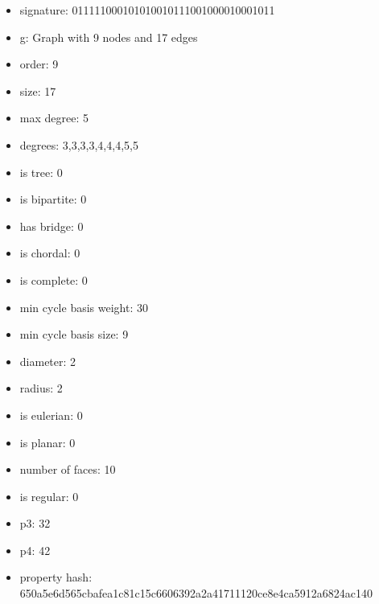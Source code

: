 \newpage
\begin{figure}
\end{figure}
\begin{itemize}
\item signature: 011111000101010010111001000010001011
\item g: Graph with 9 nodes and 17 edges
\item order: 9
\item size: 17
\item max degree: 5
\item degrees: 3,3,3,3,4,4,4,5,5
\item is tree: 0
\item is bipartite: 0
\item has bridge: 0
\item is chordal: 0
\item is complete: 0
\item min cycle basis weight: 30
\item min cycle basis size: 9
\item diameter: 2
\item radius: 2
\item is eulerian: 0
\item is planar: 0
\item number of faces: 10
\item is regular: 0
\item p3: 32
\item p4: 42
\item property hash: 650a5e6d565cbafea1c81c15c6606392a2a41711120ce8e4ca5912a6824ac140
\end{itemize}
